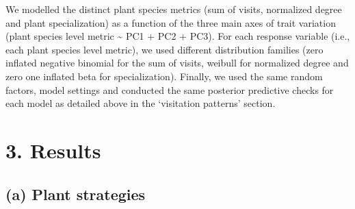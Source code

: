 \documentclass[
  12pt,
  a4paper,
]{article}
\begin{document}
We modelled the distinct plant species metrics (sum of visits, normalized degree and plant specialization) as a function of the three main axes of trait variation (plant species level metric \textasciitilde{} PC1 + PC2 + PC3). For each response variable (i.e., each plant species level metric), we used different distribution families (zero inflated negative binomial for the sum of visits, weibull for normalized degree and zero one inflated beta for specialization). Finally, we used the same random factors, model settings and conducted the same posterior predictive checks for each model as detailed above in the `visitation patterns' section.

\hypertarget{results}{%
\section{3. Results}\label{results}}

\hypertarget{a-plant-strategies}{%
\subsection{(a) Plant strategies}\label{a-plant-strategies}}
\end{document}
